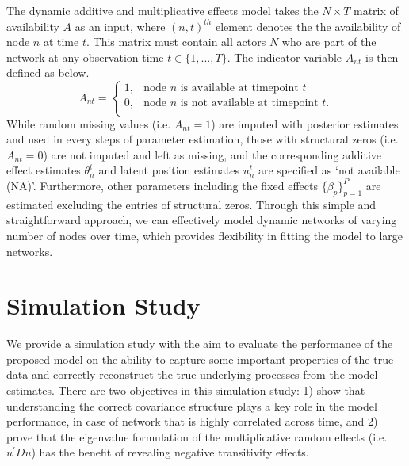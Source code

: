 \documentclass[a4paper]{article}
\begin{document}
The dynamic additive and multiplicative effects model takes the $N\times T$ matrix of availability $A$ as an input, where $(n, t)^{th}$ element denotes the the availability of node $n$ at time $t$. This matrix must contain all actors $N$ who are part of the network at any observation time $t \in \{1,...,T\}$. The indicator variable $A_{nt}$ is then defined as below.
\begin{equation*}
A_{nt} =\begin{cases}
1, & \mbox{node $n$ is available at timepoint $t$}\\
0, & \mbox{node $n$ is not available at timepoint $t$.}\\
\end{cases}
\end{equation*}
While random missing values (i.e. $A_{nt} = 1$) are imputed with posterior estimates and used in every steps of parameter estimation, those with structural zeros (i.e. $A_{nt} = 0$) are not imputed and left as missing, and the corresponding additive effect estimates $\theta^t_{n}$ and latent position estimates $u^t_{n}$ are specified as `not available (NA)'. Furthermore, other parameters including the fixed effects $\{\beta_{p}\}_{p=1}^P$ are estimated excluding the entries of structural zeros. Through this simple and straightforward approach, we can effectively model dynamic networks of varying number of nodes over time, which provides flexibility in fitting the model to large networks. 

\section{Simulation Study}\label{sec: simulation study}
We provide a simulation study with the aim to evaluate the performance of the proposed model on the ability to capture some important properties of the true data and correctly reconstruct the true underlying processes from the model estimates. There are two objectives in this simulation study: 1) show that understanding the correct covariance structure plays a key role in the model performance, in case of network that is highly correlated across time, and 2) prove that the eigenvalue formulation of the multiplicative random effects (i.e. $u^\prime Du$) has the benefit of revealing negative transitivity effects.
\end{document}
